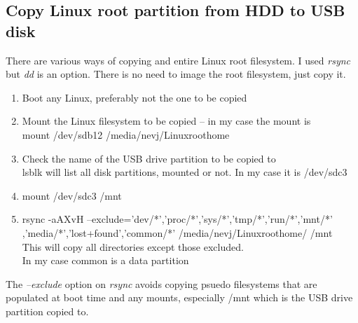 \documentclass{article}  %
\begin{document}
\subsection{Copy Linux root partition from HDD to USB disk}
There are various ways of copying and entire Linux root filesystem. I used {\em rsync} but {\em dd} is an option. There is no need to image the root filesystem, just copy it.

\begin{enumerate}
\item Boot any Linux, preferably not  the one to be copied
\item Mount the Linux filesystem to be copied -- in my case the mount is \\
mount /dev/sdb12 /media/nevj/Linuxroothome
\item Check the name of the USB drive partition to be copied to  \\
 lsblk will list all disk partitions, mounted or not.  In my case it is /dev/sdc3
\item mount /dev/sdc3 /mnt
\item rsync -aAXvH --exclude={'dev/*','proc/*','sys/*','tmp/*','run/*','mnt/*' \\
      ,'media/*','lost+found','common/*'} /media/nevj/Linuxroothome/ /mnt  \\
This will copy all directories except those excluded. \\
In my case common is a data partition
\end{enumerate}
The {\em --exclude} option on {\em rsync} avoids copying psuedo filesystems that are populated at boot time and any mounts, especially /mnt which is the USB drive partition copied to.
\end{document}
